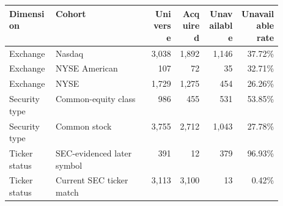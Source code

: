 {\small
\begin{tabular}{@{}p{0.17\linewidth}p{0.35\linewidth}rrrr@{}}
\toprule
Dimension & Cohort & Universe & Acquired & Unavailable & Unavailable rate \\
\midrule
Exchange & Nasdaq & 3,038 & 1,892 & 1,146 & 37.72\% \\
Exchange & NYSE American & 107 & 72 & 35 & 32.71\% \\
Exchange & NYSE & 1,729 & 1,275 & 454 & 26.26\% \\
Security type & Common-equity class & 986 & 455 & 531 & 53.85\% \\
Security type & Common stock & 3,755 & 2,712 & 1,043 & 27.78\% \\
Ticker status & SEC-evidenced later symbol & 391 & 12 & 379 & 96.93\% \\
Ticker status & Current SEC ticker match & 3,113 & 3,100 & 13 & 0.42\% \\
\bottomrule
\end{tabular}
}
